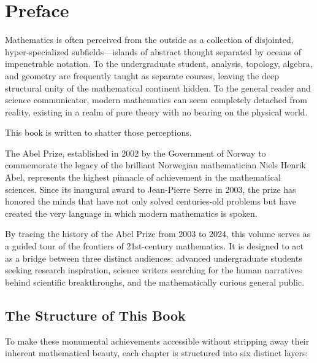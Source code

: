 \chapter*{Preface}

Mathematics is often perceived from the outside as a collection of disjointed, hyper-specialized subfields—islands of abstract thought separated by oceans of impenetrable notation. To the undergraduate student, analysis, topology, algebra, and geometry are frequently taught as separate courses, leaving the deep structural unity of the mathematical continent hidden. To the general reader and science communicator, modern mathematics can seem completely detached from reality, existing in a realm of pure theory with no bearing on the physical world.

This book is written to shatter those perceptions.

The Abel Prize, established in 2002 by the Government of Norway to commemorate the legacy of the brilliant Norwegian mathematician Niels Henrik Abel, represents the highest pinnacle of achievement in the mathematical sciences. Since its inaugural award to Jean-Pierre Serre in 2003, the prize has honored the minds that have not only solved centuries-old problems but have created the very language in which modern mathematics is spoken. 

By tracing the history of the Abel Prize from 2003 to 2024, this volume serves as a guided tour of the frontiers of 21st-century mathematics. It is designed to act as a bridge between three distinct audiences: advanced undergraduate students seeking research inspiration, science writers searching for the human narratives behind scientific breakthroughs, and the mathematically curious general public.

\section*{The Structure of This Book}

To make these monumental achievements accessible without stripping away their inherent mathematical beauty, each chapter is structured into six distinct layers:

